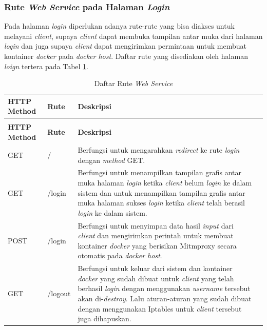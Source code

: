 \subsubsection{Rute \textit{Web Service} pada Halaman \textit{Login}}
Pada halaman \textit{login} diperlukan adanya rute-rute yang bisa diakses untuk melayani \textit{client}, supaya \textit{client} dapat membuka tampilan antar muka dari halaman \textit{login} dan juga supaya \textit{client} dapat mengirimkan permintaan untuk membuat kontainer \textit{docker} pada \textit{docker host}. Daftar rute yang disediakan oleh halaman \textit{loign} tertera pada Tabel \ref{tabelRuteWebServiceHalamnLogin}.\\
\begin{longtable}{|p{}|p{}|p{}|p{}|} %
	
	\caption{Daftar Rute \textit{Web Service}} \label{tabelRuteWebServiceHalamnLogin} \\
	\hline
	\textbf{HTTP Method} & \textbf{Rute} & \textbf{Deskripsi} \\ \hline
	
	\endfirsthead
	\caption[]{Daftar Rute \textit{Web Service}}  \\
	\hline
	\textbf{HTTP Method} & \textbf{Rute} & \textbf{Deskripsi}  \\ \hline
	
	\endhead
	\endfoot
	\endlastfoot
	
	GET & / & Berfungsi untuk mengarahkan \textit{redirect} ke rute \textit{login} dengan \textit{method} GET.\\ \hline
	GET & /login & Berfungsi untuk menampilkan tampilan grafis antar muka halaman \textit{login} ketika \textit{client} belum \textit{login} ke dalam sistem dan untuk menampilkan tampilan grafis antar muka halaman sukses \textit{login} ketika \textit{client} telah berasil \textit{login} ke dalam sistem.\\ \hline
	POST & /login & Berfungsi untuk menyimpan data hasil \textit{input} dari \textit{client} dan mengirimkan perintah untuk membuat kontainer \textit{docker} yang berisikan Mitmproxy secara otomatis pada \textit{docker host}.\\ \hline
	GET & /logout & Berfungsi untuk keluar dari sistem dan kontainer \textit{docker} yang sudah dibuat untuk \textit{client} yang telah berhasil \textit{login} dengan menggunakan \textit{username} tersebut akan di-\textit{destroy}. Lalu aturan-aturan yang sudah dibuat dengan menggunakan Iptables untuk \textit{client} tersebut juga dihapuskan.\\ \hline
	
\end{longtable}

